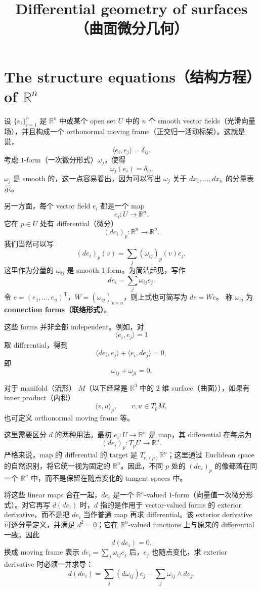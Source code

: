 \documentclass[UTF8,11pt,a4paper]{ctexart}
\title{Differential geometry of surfaces（曲面微分几何）}
\author{}
\date{}
\begin{document}
\maketitle
\section{The structure equations（结构方程）of $\mathbb{R}^n$}

设 $\{e_i\}_{i=1}^n$ 是 $\mathbb{R}^n$ 中或某个 open set $U$ 中的 $n$ 个 smooth vector fields（光滑向量场），并且构成一个 orthonormal moving frame（正交归一活动标架）。这就是说，
\[
\langle e_i,e_j\rangle=\delta_{ij}.
\]
考虑 $1$-form（一次微分形式）$\omega_j$，使得
\[
\omega_j(e_i)=\delta_{ij}.
\]
$\omega_j$ 是 smooth 的，这一点容易看出，因为可以写出 $\omega_j$ 关于 $dx_1,\ldots,dx_n$ 的分量表示。

另一方面，每个 vector field $e_i$ 都是一个 map
\[
e_i\colon U\longrightarrow\mathbb{R}^n.
\]
它在 $p\in U$ 处有 differential（微分）
\[
(de_i)_p\colon\mathbb{R}^n\longrightarrow\mathbb{R}^n.
\]
我们当然可以写
\[
(de_i)_p(v)=\sum_j(\omega_{ij})_p(v)e_j,
\]
这里作为分量的 $\omega_{ij}$ 是 smooth $1$-form。为简洁起见，写作
\[
de_i=\sum_j\omega_{ij}e_j.
\]
令 $e=(e_1,\ldots,e_n)^{\mathsf T}$，$W=(\omega_{ij})_{n\times n}$，则上式也可简写为 $de=We$。
称 $\omega_{ij}$ 为 \textbf{connection forms（联络形式）}。

这些 forms 并非全部 independent。例如，对
\[
\langle e_i,e_j\rangle=1
\]
取 differential，得到
\[
\langle de_i,e_j\rangle+\langle e_i,de_j\rangle=0,
\]
即
\[
\omega_{ij}+\omega_{ji}=0.
\]

对于 manifold（流形） $M$（以下经常是 $\mathbb{R}^3$ 中的 $2$ 维 surface（曲面）），如果有 inner product（内积）
\[
\langle v,u\rangle_p,\qquad v,u\in T_pM,
\]
也可定义 orthonormal moving frame 等。

这里需要区分 $d$ 的两种用法。最初 $e_i\colon U\to\mathbb{R}^n$ 是 map，其 differential 在每点为
\[
(de_i)_p\colon T_pU\longrightarrow\mathbb{R}^n.
\]
严格来说，map 的 differential 的 target 是 $T_{e_i(p)}\mathbb{R}^n$；这里通过 Euclidean space 的自然识别，将它统一视为固定的 $\mathbb{R}^n$。因此，不同 $p$ 处的 $(de_i)_p$ 的像都落在同一个 $\mathbb{R}^n$ 中，而不是保留在随点变化的 tangent spaces 中。

将这些 linear maps 合在一起，$de_i$ 是一个 $\mathbb{R}^n$-valued $1$-form（向量值一次微分形式）。对它再写 $d(de_i)$ 时，$d$ 指的是作用于 vector-valued forms 的 exterior derivative，而不是把 $de_i$ 当作普通 map 再求 differential。该 exterior derivative 可逐分量定义，并满足 $d^2=0$；它在 $\mathbb{R}^n$-valued functions 上与原来的 differential 一致。因此
\[
d(de_i)=0.
\]
换成 moving frame 表示 $de_i=\sum_j\omega_{ij}e_j$ 后，$e_j$ 也随点变化，求 exterior derivative 时必须一并求导：
\[
d(de_i)=\sum_j(d\omega_{ij})e_j-\sum_j\omega_{ij}\wedge de_j.
\]
\end{document}
